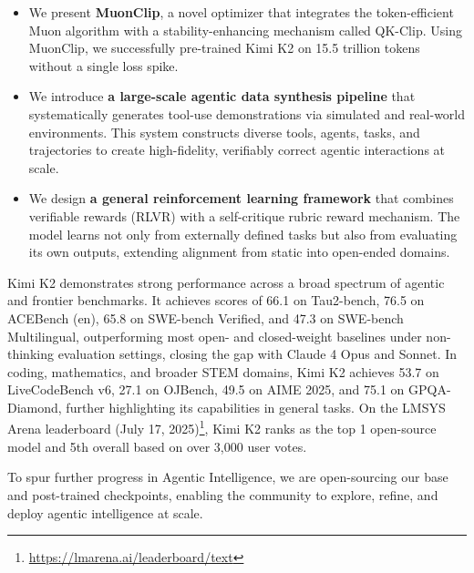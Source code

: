 \begin{itemize}
\item We present \textbf{MuonClip}, a novel optimizer that integrates the token-efficient Muon algorithm with a stability-enhancing mechanism called QK-Clip. Using MuonClip, we successfully pre-trained Kimi K2 on 15.5 trillion tokens without a single loss spike.

\item We introduce \textbf{a large-scale agentic data synthesis pipeline} that systematically generates tool-use demonstrations via simulated and real-world environments. This system constructs diverse tools, agents, tasks, and trajectories to create high-fidelity, verifiably correct agentic interactions at scale.

\item We design \textbf{a general reinforcement learning framework} that combines verifiable rewards (RLVR) with a self-critique rubric reward mechanism. The model learns not only from externally defined tasks but also from evaluating its own outputs, extending alignment from static into open-ended domains.
\end{itemize}

Kimi K2 demonstrates strong performance across a broad spectrum of agentic and frontier benchmarks. It achieves scores of 66.1 on Tau2-bench, 76.5 on ACEBench (en), 65.8 on SWE-bench Verified, and 47.3 on SWE-bench Multilingual, outperforming most open- and closed-weight baselines under non-thinking evaluation settings, closing the gap with Claude 4 Opus and Sonnet. In coding, mathematics, and broader STEM domains, Kimi K2 achieves 53.7 on LiveCodeBench v6, 27.1 on OJBench, 49.5 on AIME 2025, and 75.1 on GPQA-Diamond, further highlighting its capabilities in general tasks. On the LMSYS Arena leaderboard (July 17, 2025)\footnote{\url{https://lmarena.ai/leaderboard/text}}, Kimi K2 ranks as the top 1 open-source model and 5th overall based on over 3,000 user votes. 

To spur further progress in Agentic Intelligence, we are open-sourcing our base and post-trained checkpoints, enabling the community to explore, refine, and deploy agentic intelligence at scale.



